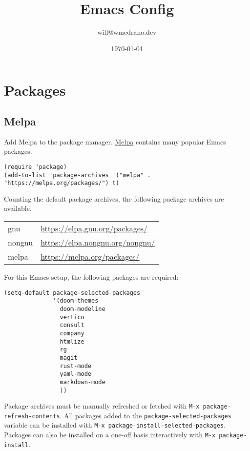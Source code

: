 \documentclass[11pt]{article}
\author{will@wmedrano.dev}
\date{\today}
\title{Emacs Config}
\begin{document}
\maketitle
\tableofcontents

\section{Packages}
\label{sec:org5602a42}

\subsection{Melpa}
\label{sec:org33e78ba}

Add Melpa to the package manager. \href{https://melpa.org}{Melpa} contains many popular Emacs packages.

\begin{verbatim}
(require 'package)
(add-to-list 'package-archives '("melpa" . "https://melpa.org/packages/") t)
\end{verbatim}

Counting the default package archives, the following package archives are
available.

\begin{center}
\begin{tabular}{ll}
gnu & \url{https://elpa.gnu.org/packages/}\\
nongnu & \url{https://elpa.nongnu.org/nongnu/}\\
melpa & \url{https://melpa.org/packages/}\\
\end{tabular}
\end{center}

For this Emacs setup, the following packages are required:

\begin{verbatim}
(setq-default package-selected-packages
              '(doom-themes
                doom-modeline
                vertico
                consult
                company
                htmlize
                rg
                magit
                rust-mode
                yaml-mode
                markdown-mode
                ))
\end{verbatim}

Package archives must be manually refreshed or fetched with \texttt{M-x
package-refresh-contents}. All packages added to the \texttt{package-selected-packages}
variable can be installed with \texttt{M-x package-install-selected-packages}. Packages
can also be installed on a one-off basis interactively with \texttt{M-x
package-install}.
\end{document}
